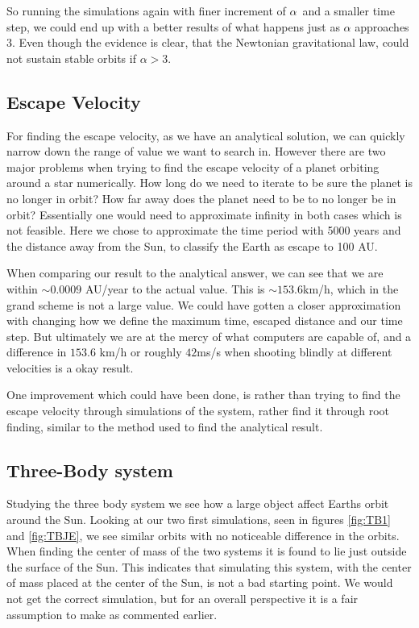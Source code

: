 \documentclass[%
reprint,
nofootinbib,
amsmath,amssymb,
aps,
]{revtex4-1}
\begin{document}
So running the simulations again with finer increment of $\alpha$ and a smaller time step, we could end up with a better results of what happens just as $\alpha$ approaches 3. 
Even though the evidence is clear, that the Newtonian gravitational law, could not sustain stable orbits if $\alpha > 3$. 
\subsection{Escape Velocity} %
For finding the escape velocity, as we have an analytical solution, we can quickly narrow down the range of value we want to search in. However there are two major problems when trying to find the escape velocity of a planet orbiting around a star numerically. How long do we need to iterate to be sure the planet is no longer in orbit? How far away does the planet need to be to no longer be in orbit? Essentially one would need to approximate infinity in both cases which is not feasible. Here we chose to approximate the time period with 5000 years and the distance away from the Sun, to classify the Earth as escape to 100 AU.

When comparing our result to the analytical answer, we can see that we are within $\sim 0.0009$ AU/year to the actual value. This is $\sim 153.6$km/h, which in the grand scheme is not a large value. We could have gotten a closer approximation with changing how we define the maximum time, escaped distance and our time step. But ultimately we are at the mercy of what computers are capable of, and a difference in $153.6$ km/h or roughly $42$ms/s when shooting blindly at different velocities is a okay result. 

One improvement which could have been done, is rather than trying to find the escape velocity through simulations of the system, rather find it through root finding, similar to the method used to find the analytical result. 
\subsection{Three-Body system} %
Studying the three body system we see how a large object affect Earths orbit around the Sun. Looking at our two first simulations, seen in figures \ref{fig:TB1} and \ref{fig:TBJE}, we see similar orbits with no noticeable difference in the orbits. When finding the center of mass of the two systems it is found to lie just outside the surface of the Sun. This indicates that simulating this system, with the center of mass placed at the center of the Sun, is not a bad starting point. We would not get the correct simulation, but for an overall perspective it is a fair assumption to make as commented earlier. 
\end{document}
